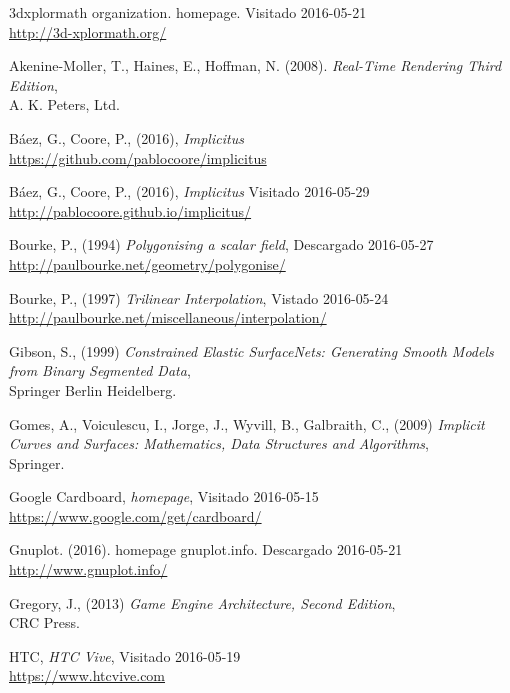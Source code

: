 \documentclass[12pt]{article}
\begin{document}
\begin{thebibliography}{9}

3dxplormath organization. homepage. 
Visitado 2016-05-21 
\\\url{http://3d-xplormath.org/}

Akenine-Moller, T., Haines, E., Hoffman, N. (2008). \textit{Real-Time Rendering Third Edition},\\A. K. Peters, Ltd.

Báez, G., Coore, P., (2016), \textit{Implicitus}
\\\url{https://github.com/pablocoore/implicitus}

Báez, G., Coore, P., (2016), \textit{Implicitus}
Visitado 2016-05-29 
\\\url{http://pablocoore.github.io/implicitus/}

Bourke, P., (1994) \textit{Polygonising a scalar field},
Descargado 2016-05-27 
\\\url{http://paulbourke.net/geometry/polygonise/}

Bourke, P., (1997) \textit{Trilinear Interpolation},
Vistado 2016-05-24 
\\\url{http://paulbourke.net/miscellaneous/interpolation/}

Gibson, S., (1999) \textit{Constrained Elastic SurfaceNets: Generating Smooth Models from Binary Segmented Data},\\
Springer Berlin Heidelberg.

Gomes, A., Voiculescu, I., Jorge, J., Wyvill, B., Galbraith, C., (2009) \textit{Implicit Curves and Surfaces: Mathematics, Data Structures and Algorithms},\\
Springer.

Google Cardboard, \textit{homepage},
Visitado 2016-05-15 
\\\url{https://www.google.com/get/cardboard/}

Gnuplot. (2016). homepage gnuplot.info. 
Descargado 2016-05-21 
\\\url{http://www.gnuplot.info/}

Gregory, J., (2013) \textit{Game Engine Architecture, Second Edition},\\
CRC Press.

HTC, \textit{HTC Vive},
Visitado 2016-05-19 
\\\url{https://www.htcvive.com}


\end{thebibliography}
\end{document}
